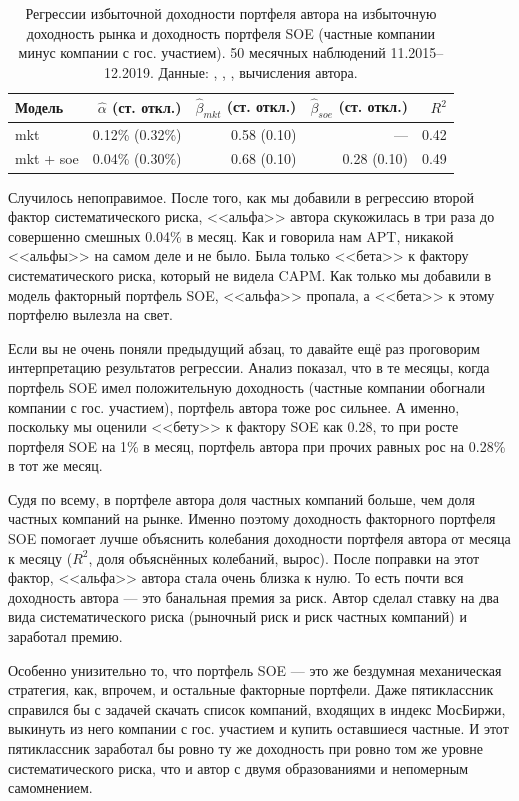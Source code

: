 \begin{table}[h]
\centering
\begin{tabular}{l|r|r|r|r}
Модель &
$\hat{\alpha}$ (ст. откл.) &
$\hat{\beta}_{mkt}$ (ст. откл.) &
$\hat{\beta}_{soe}$ (ст. откл.) &
$R^2$ \\ \hline
mkt       & 0.12\% (0.32\%) & 0.58 (0.10) & ---         & 0.42 \\
mkt + soe & 0.04\% (0.30\%) & 0.68 (0.10) & 0.28 (0.10) & 0.49
\end{tabular}
\caption{Регрессии избыточной доходности портфеля автора на избыточную 
доходность рынка и доходность портфеля SOE (частные компании минус компании с 
гос. участием). 50 месячных наблюдений 11.2015--12.2019. Данные: 
\cite{moex2020}, \cite{cbr2020}, \cite{capmruWeb}, вычисления автора.}
\label{two_factor_regression_results}
\end{table}

Случилось непоправимое. После того, как мы добавили в регрессию второй фактор 
систематического риска, <<альфа>> автора скукожилась в три раза до совершенно 
смешных 0.04\% в месяц. Как и говорила нам APT, никакой <<альфы>> на самом деле 
и не было. Была только <<бета>> к фактору систематического риска, который не 
видела CAPM. Как только мы добавили в модель факторный портфель SOE, <<альфа>> 
пропала, а <<бета>> к этому портфелю вылезла на свет.

Если вы не очень поняли предыдущий абзац, то давайте ещё раз проговорим 
интерпретацию результатов регрессии. Анализ показал, что в те месяцы, когда 
портфель SOE имел положительную доходность (частные компании обогнали компании с 
гос. участием), портфель автора тоже рос сильнее. А именно, поскольку мы оценили 
<<бету>> к фактору SOE как 0.28, то при росте портфеля SOE на 1\% в месяц, 
портфель автора при прочих равных рос на 0.28\% в тот же месяц.

Судя по всему, в портфеле автора доля частных компаний больше, чем доля частных 
компаний на рынке. Именно поэтому доходность факторного портфеля SOE помогает 
лучше объяснить колебания доходности портфеля автора от месяца к месяцу ($R^2$, 
доля объяснённых колебаний, вырос). После поправки на этот фактор, <<альфа>> 
автора стала очень близка к нулю. То есть почти вся доходность автора --- это 
банальная премия за риск. Автор сделал ставку на два вида систематического риска 
(рыночный риск и риск частных компаний) и заработал премию.

Особенно унизительно то, что портфель SOE --- это же бездумная механическая 
стратегия, как, впрочем, и остальные факторные портфели. Даже пятиклассник 
справился бы с задачей скачать список компаний, входящих в индекс МосБиржи, 
выкинуть из него компании с гос. участием и купить оставшиеся частные. И этот 
пятиклассник заработал бы ровно ту же доходность при ровно том же уровне 
систематического риска, что и автор с двумя образованиями и непомерным 
самомнением.


